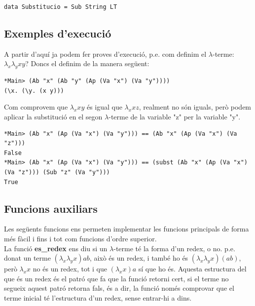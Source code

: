 \documentclass[10pt,a4paper]{article}
\begin{document}
\lstset{language=Haskell, breaklines=true, basicstyle=\footnotesize}
\begin{lstlisting}[frame=mystyle]
data Substitucio = Sub String LT
\end{lstlisting}

\subsection*{Exemples d'execució}

A partir d'aquí ja podem fer proves d'execució, p.e. com definim el $\lambda$-terme: $\lambda_x \lambda_y x y$? Doncs el definim de la manera següent:

\lstset{language=Haskell, breaklines=true, basicstyle=\footnotesize}
\begin{lstlisting}[frame=mystyle]
*Main> (Ab "x" (Ab "y" (Ap (Va "x") (Va "y"))))
(\x. (\y. (x y)))
\end{lstlisting}

Com comprovem que $\lambda_x x y$ és igual que $\lambda_x x z$, realment no són iguals, però podem aplicar la substitució en el segon $\lambda$-terme de la variable "z" per la variable "y".

\lstset{language=Haskell, breaklines=true, basicstyle=\footnotesize}
\begin{lstlisting}[frame=mystyle]
*Main> (Ab "x" (Ap (Va "x") (Va "y"))) == (Ab "x" (Ap (Va "x") (Va "z")))
False
*Main> (Ab "x" (Ap (Va "x") (Va "y"))) == (subst (Ab "x" (Ap (Va "x") (Va "z"))) (Sub "z" (Va "y")))
True
\end{lstlisting}

\clearpage

\subsection{Funcions auxiliars}

Les següents funcions ens permeten implementar les funcions principals de forma més fàcil i fins i tot com funcions d'ordre superior. \\

La funció \textbf{es\_redex} ens diu si un $\lambda$-terme té la forma d'un redex, o no. p.e. donat un terme $(\lambda_x \lambda_y x) a b$, això és un redex, i també ho és $(\lambda_x \lambda_y x) (a b)$, però $\lambda_x x$ no és un redex, tot i que $(\lambda_x x) a$ sí que ho és. Aquesta estructura del que és un redex és el patró que fa que la funció retorni cert, si el terme no segueix aquest patró retorna fals, és a dir, la funció només comprovar que el terme inicial té l'estructura d'un redex, sense entrar-hi a dins.
\end{document}
